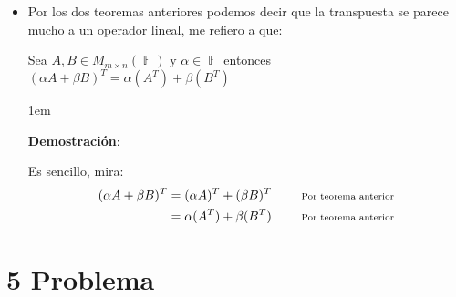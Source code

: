 \documentclass[12pt, fleqn]{article}                             %
\newenvironment{SmallIndentation}[1][0.75em]                    %
        {\begin{adjustwidth}{#1}{}\begin{footnotesize}}             %
        {\end{footnotesize}\end{adjustwidth}}                       %
\DeclareMathOperator \Space {\quad}                             %
\newcommand \Remember[1]{\Space\text{\scriptsize{#1}}}          %
\theoremstyle{break}                                            %
\DeclareMathOperator \GenericField {\mathbb{F}}                 %
\begin{document}
\begin{itemize}
\begin{SmallIndentation}[1em]
            \end{SmallIndentation}

        \item
            Por los dos teoremas anteriores podemos decir que la transpuesta se parece mucho a 
            un operador lineal, me refiero a que:

            Sea $A,B \in M_{m \times n}(\GenericField)$ y $\alpha \in \GenericField$ entonces 
            $(\alpha A + \beta B)^T = \alpha(A^T) + \beta(B^T)$

            \begin{SmallIndentation}[1em]
                \textbf{Demostración}:
                
                Es sencillo, mira:
                \begin{align*}
                    (\alpha A + \beta B)^T
                        &= (\alpha A)^T + (\beta B)^T
                            && \Remember{Por teorema anterior} \\
                        &= \alpha (A^T) + \beta (B^T)
                            && \Remember{Por teorema anterior}
                \end{align*}
            
            \end{SmallIndentation}
                

    \end{itemize}



\clearpage
\section{5 Problema}
\end{document}
